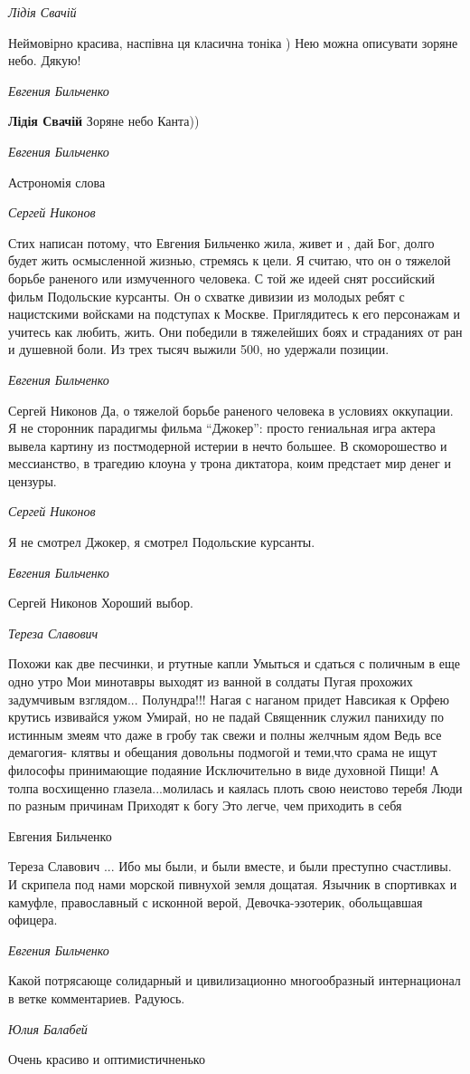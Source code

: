 \emph{Лідія Свачій}

Неймовірно красива, наспівна ця класична тоніка ) Нею можна описувати зоряне небо. Дякую!

\emph{Евгения Бильченко}

\textbf{Лідія Свачій} Зоряне небо Канта))

\emph{Евгения Бильченко}

Астрономія слова

\emph{Сергей Никонов}

Стих написан потому, что Евгения Бильченко жила, живет и , дай Бог, долго будет
жить осмысленной жизнью, стремясь к цели. Я считаю, что он о тяжелой борьбе
раненого или измученного человека. С той же идеей снят российский фильм
Подольские курсанты. Он о схватке дивизии из молодых ребят с нацистскими
войсками на подступах к Москве. Приглядитесь к его персонажам и учитесь как
любить, жить. Они победили в тяжелейших боях и страданиях от ран и душевной
боли. Из трех тысяч выжили 500, но удержали позиции.

\emph{Евгения Бильченко}

Сергей Никонов Да, о тяжелой борьбе раненого человека в условиях оккупации. Я
не сторонник парадигмы фильма \enquote{Джокер}: просто гениальная игра актера вывела
картину из постмодерной истерии в нечто большее. В скоморошество и мессианство,
в трагедию клоуна у трона диктатора, коим предстает мир денег и цензуры.

\emph{Сергей Никонов}

Я не смотрел Джокер, я смотрел Подольские курсанты.

\emph{Евгения Бильченко}

Сергей Никонов Хороший выбор.

\emph{Тереза Славович}

Похожи как две песчинки,
и ртутные капли
Умыться и сдаться с поличным
в еще одно утро
Мои минотавры выходят из ванной в солдаты
Пугая прохожих задумчивым взглядом...
Полундра!!!
Нагая с наганом придет Навсикая к Орфею
крутись извивайся ужом
Умирай, но не падай
Священник служил панихиду по истинным змеям
что даже в гробу так свежи и полны желчным ядом
Ведь все демагогия- клятвы и обещания
довольны подмогой и теми,что срама не ищут
философы принимающие подаяние
Исключительно
в виде духовной Пищи!
А толпа восхищенно глазела...молилась и каялась
плоть свою неистово теребя
Люди по разным причинам
Приходят к богу
Это легче, чем
приходить в себя

Евгения Бильченко

Тереза Славович ... Ибо мы были, и были вместе, и были преступно счастливы.  И
скрипела под нами морской пивнухой земля дощатая.  Язычник в спортивках и
камуфле, православный с исконной верой, Девочка-эзотерик, обольщавшая офицера.

\emph{Евгения Бильченко}

Какой потрясающе солидарный и цивилизационно многообразный интернационал в
ветке комментариев. Радуюсь.

\emph{Юлия Балабей}

Очень красиво и оптимистичненько
